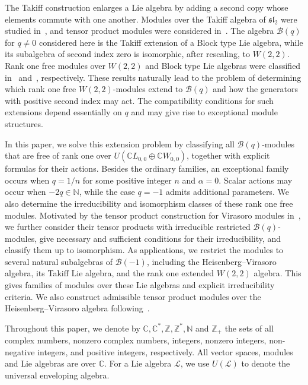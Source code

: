 \documentclass[a4paper]{amsart}
\numberwithin{equation}{section}
\begin{document}
The Takiff construction enlarges a Lie algebra by adding a second copy whose elements commute with one another. Modules over the Takiff algebra of $\mathfrak{sl}_2$ were studied in~\cite{Zhu24,Zhu25}, and tensor product modules were considered in~\cite{QZ26}. The algebra $\mathcal B(q)$ for $q\neq0$ considered here is the Takiff extension of a Block type Lie algebra, while its subalgebra of second index zero is isomorphic, after rescaling, to $W(2,2)$. Rank one free modules over $W(2,2)$ and Block type Lie algebras were classified in~\cite{CG17} and~\cite{CY18}, respectively. These results naturally lead to the problem of determining which rank one free $W(2,2)$-modules extend to $\mathcal B(q)$ and how the generators with positive second index may act. The compatibility conditions for such extensions depend essentially on $q$ and may give rise to exceptional module structures.




In this paper, we solve this extension problem by classifying all $\mathcal B(q)$-modules that are free of rank one over $U(\mathbb C L_{0,0}\oplus\mathbb C W_{0,0})$, together with explicit formulas for their actions. Besides the ordinary families, an exceptional family occurs when $q=1/n$ for some positive integer $n$ and $\alpha=0$. Scalar actions may occur when $-2q\in\mathbb N$, while the case $q=-1$ admits additional parameters. We also determine the irreducibility and isomorphism classes of these rank one free modules. Motivated by the tensor product construction for Virasoro modules in~\cite{TZ13}, we further consider their tensor products with irreducible restricted $\mathcal B(q)$-modules, give necessary and sufficient conditions for their irreducibility, and classify them up to isomorphism.
As applications, we restrict the modules to several natural subalgebras of $\mathcal B(-1)$, including the Heisenberg--Virasoro algebra, its Takiff Lie algebra, and the rank one extended $W(2,2)$ algebra. This gives families of modules over these Lie algebras and explicit irreducibility criteria. We also construct admissible tensor product modules over the Heisenberg--Virasoro algebra following~\cite{CH20}.

Throughout this paper, we denote by $\mathbb{C},\mathbb{C}^{*},\mathbb{Z},\mathbb{Z}^*,\mathbb{N}$ and $\mathbb{Z}_+$  the sets of all complex numbers, nonzero complex numbers, integers, nonzero integers, non-negative integers, and positive integers, respectively. All vector spaces, modules and Lie algebras are over $\mathbb{C}$. 
For a Lie algebra $\mathcal{L}$, we use $U(\mathcal{L})$ to denote the universal enveloping algebra.
\end{document}
